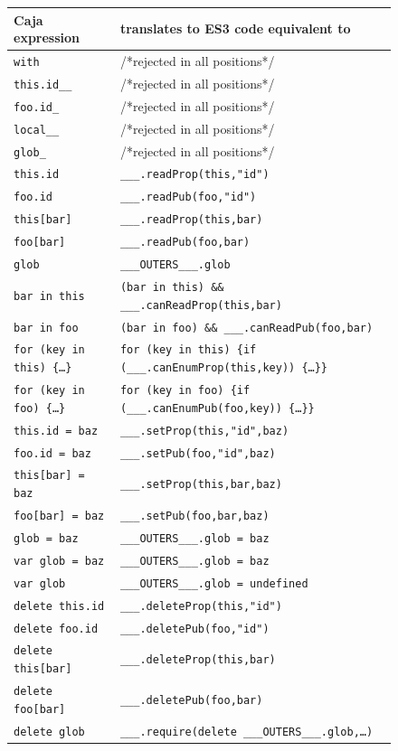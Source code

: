 \documentclass[letterpaper,twocolumn,10pt]{article}
\newcommand{\code}[1]{{\tt {#1}}}              %
\begin{document}
\begin{figure}
\begin{tabular}{ll}
  Caja expression    & translates to ES3 code equivalent to\\ 
  \hline
  \code{with}        & /*rejected in all positions*/ \\
  \hline
  \code{this.id\_\_} & /*rejected in all positions*/ \\
  \code{foo.id\_}    & /*rejected in all positions*/ \\      
  \code{local\_\_}   & /*rejected in all positions*/ \\        
  \code{glob\_}      & /*rejected in all positions*/ \\        
  \hline
  \code{this.id}     & \code{\_\_\_.readProp(this,"id")}\\
  \code{foo.id}      & \code{\_\_\_.readPub(foo,"id")} \\
  \code{this[bar]}   & \code{\_\_\_.readProp(this,bar)} \\
  \code{foo[bar]}    & \code{\_\_\_.readPub(foo,bar)}  \\
  \code{glob}        & \code{\_\_\_OUTERS\_\_\_.glob} \\
  \hline
  \code{bar in this}           
    & \code{(bar in this) \&\& \_\_\_.canReadProp(this,bar)} \\
  \code{bar in foo}            
    & \code{(bar in foo) \&\& \_\_\_.canReadPub(foo,bar)} \\
  \code{for (key in this)\ \{\ldots\}} 
    &\code{for (key in this)
     \{if (\_\_\_.canEnumProp(this,key))\ \{\ldots\}\}}\\
  \code{for (key in foo)\ \{\ldots\}}  
    & \code{for (key in foo)
     \{if (\_\_\_.canEnumPub(foo,key))\ \{\ldots\}\}} \\
  \hline
  \code{this.id = baz}    & \code{\_\_\_.setProp(this,"id",baz)} \\
  \code{foo.id = baz}     & \code{\_\_\_.setPub(foo,"id",baz)} \\
  \code{this[bar] = baz}  & \code{\_\_\_.setProp(this,bar,baz)} \\
  \code{foo[bar] = baz}   & \code{\_\_\_.setPub(foo,bar,baz)} \\
  \code{glob = baz}       & \code{\_\_\_OUTERS\_\_\_.glob = baz} \\
  \code{var glob = baz}   & \code{\_\_\_OUTERS\_\_\_.glob = baz} \\
  \code{var glob}         & \code{\_\_\_OUTERS\_\_\_.glob = undefined} \\
  \hline               
  \code{delete this.id}   & \code{\_\_\_.deleteProp(this,"id")} \\
  \code{delete foo.id}    & \code{\_\_\_.deletePub(foo,"id")} \\
  \code{delete this[bar]} & \code{\_\_\_.deleteProp(this,bar)} \\
  \code{delete foo[bar]}  & \code{\_\_\_.deletePub(foo,bar)} \\
  \code{delete glob}      
         & \code{\_\_\_.require(delete \_\_\_OUTERS\_\_\_.glob,\ldots)} \\
\end{tabular}


\end{figure}
\end{document}
